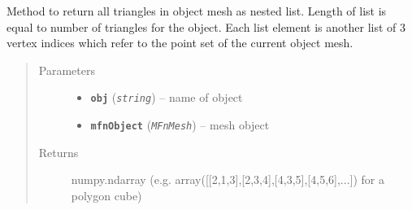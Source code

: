 \documentclass[letterpaper,10pt,english]{sphinxmanual}
\begin{document}
\begin{fulllineitems}
\label{pk_src.misc:pk_src.misc.getTriangles}
Method to return all triangles in object mesh as nested list. Length of list is equal to number of triangles for the object. Each list element is another list of 3 vertex indices which refer to the point set of the current object mesh.
\begin{quote}\begin{description}
\item[{Parameters}] \leavevmode\begin{itemize}
\item {} 
\textbf{\texttt{obj}} (\emph{\texttt{string}}) -- name of object

\item {} 
\textbf{\texttt{mfnObject}} (\emph{\texttt{MFnMesh}}) -- mesh object

\end{itemize}

\item[{Returns}] \leavevmode
numpy.ndarray (e.g. array({[}{[}2,1,3{]},{[}2,3,4{]},{[}4,3,5{]},{[}4,5,6{]},...{]}) for a polygon cube)


\end{description}
\end{quote}
\end{fulllineitems}
\end{document}
